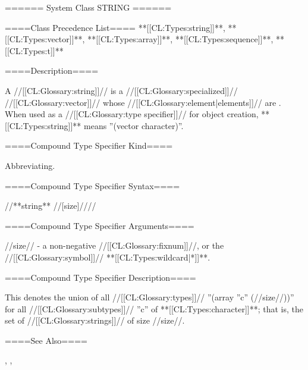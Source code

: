====== System Class STRING ======

====Class Precedence List==== **[[CL:Types:string]]**, **[[CL:Types:vector]]**, **[[CL:Types:array]]**, **[[CL:Types:sequence]]**, **[[CL:Types:t]]**

====Description====

A //[[CL:Glossary:string]]// is a //[[CL:Glossary:specialized]]// //[[CL:Glossary:vector]]// whose //[[CL:Glossary:element|elements]]// are . When used as a //[[CL:Glossary:type specifier]]// for object creation, **[[CL:Types:string]]** means ''(vector character)''.

====Compound Type Specifier Kind====

Abbreviating.

====Compound Type Specifier Syntax====

//**string** //[size]////

====Compound Type Specifier Arguments====

//size// - a non-negative //[[CL:Glossary:fixnum]]//, or the //[[CL:Glossary:symbol]]// **[[CL:Types:wildcard|*]]**.

====Compound Type Specifier Description====

This denotes the union of all //[[CL:Glossary:types]]// ''(array ''c'' (//size//))'' for all //[[CL:Glossary:subtypes]]// ''c'' of **[[CL:Types:character]]**; that is, the set of //[[CL:Glossary:strings]]// of size //size//.

====See Also====

{\secref\StringConcepts}, {\secref\Doublequote}, {\secref\PrintingStrings}

  
